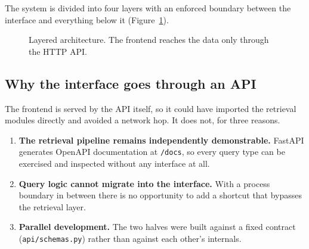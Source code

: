 \documentclass[11pt,a4paper]{article}
\begin{document}
The system is divided into four layers with an enforced boundary between the
interface and everything below it (Figure~\ref{fig:arch}).

\begin{figure}[h]
\centering
{}
\caption{Layered architecture. The frontend reaches the data only through the
HTTP API.}
\label{fig:arch}
\end{figure}

\subsection{Why the interface goes through an API}

The frontend is served by the API itself, so it could have imported the
retrieval modules directly and avoided a network hop. It does not, for three
reasons.

\begin{enumerate}[itemsep=2pt]
  \item \textbf{The retrieval pipeline remains independently demonstrable.}
        FastAPI generates OpenAPI documentation at \texttt{/docs}, so every
        query type can be exercised and inspected without any interface at all.
  \item \textbf{Query logic cannot migrate into the interface.} With a process
        boundary in between there is no opportunity to add a shortcut that
        bypasses the retrieval layer.
  \item \textbf{Parallel development.} The two halves were built against a fixed
        contract (\texttt{api/schemas.py}) rather than against each other's
        internals.
\end{enumerate}
\end{document}
